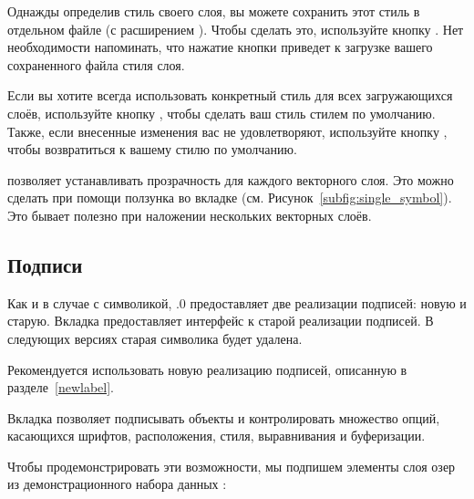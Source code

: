 Однажды определив стиль своего слоя, вы можете сохранить этот стиль в
отдельном файле (с расширением ). Чтобы сделать это,
используйте кнопку . Нет необходимости
напоминать, что нажатие кнопки  приведет к
загрузке вашего сохраненного файла стиля слоя.

Если вы хотите всегда использовать конкретный стиль для всех загружающихся
слоёв, используйте кнопку ,
чтобы сделать ваш стиль стилем по умолчанию. Также, если внесенные изменения
вас не удовлетворяют, используйте кнопку ,
чтобы возвратиться к вашему стилю по умолчанию.

 \label{sec:vect_transparency}

\qg позволяет устанавливать прозрачность для каждого векторного слоя. Это
можно сделать при помощи ползунка  во вкладке 
(см. Рисунок~\ref{subfig:single_symbol}). Это бывает полезно при наложении
нескольких векторных слоёв.

\subsection{Подписи}\label{labeltab}

Как и в случае с символикой, .0 предоставляет две реализации подписей:
новую и старую. Вкладка  предоставляет интерфейс к старой реализации
подписей. В следующих версиях старая символика будет удалена.

Рекомендуется использовать новую реализацию подписей, описанную в разделе~\ref{newlabel}.

Вкладка  позволяет подписывать объекты и контролировать
множество опций, касающихся шрифтов, расположения, стиля, выравнивания и
буферизации.

Чтобы продемонстрировать эти возможности, мы подпишем элементы слоя озер
из демонстрационного набора данных \qg:

